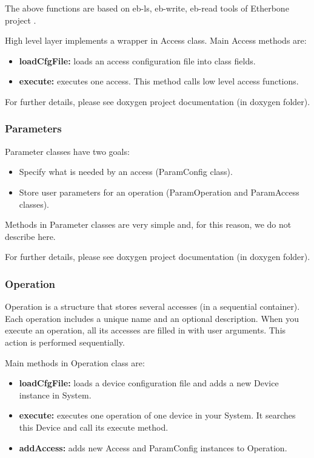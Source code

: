 The above functions are based on eb-ls, eb-write, eb-read tools of Etherbone project \cite{Etherbone-repo}.

High level layer implements a wrapper in Access class. Main Access methods are:

\begin{itemize}
\item{\textbf{loadCfgFile:} loads an access configuration file into class fields.}
\item{\textbf{execute:} executes one access. This method calls low level access functions.}
\end{itemize}

For further details, please see doxygen project documentation (in doxygen folder).

\subsubsection{Parameters}

Parameter classes have two goals:

\begin{itemize}
 \item {Specify what is needed by an access (ParamConfig class).}
 \item {Store user parameters for an operation (ParamOperation and ParamAccess classes).}
\end{itemize}

Methods in Parameter classes are very simple and, for this reason, we do not describe here.

For further details, please see doxygen project documentation (in doxygen folder).

\subsubsection{Operation}

Operation is a structure that stores several accesses (in a sequential container). Each operation includes a unique name and an optional description. 
When you execute an operation, all its accesses are filled in with user arguments. This action is performed sequentially. 

Main methods in Operation class are:

\begin{itemize}
\item{\textbf{loadCfgFile:} loads a device configuration file and adds a new Device instance in System.}
\item{\textbf{execute:} executes one operation of one device in your System. It searches this Device and call its execute method.}
\item{\textbf{addAccess:} adds new Access and ParamConfig instances to Operation.}
\end{itemize}

